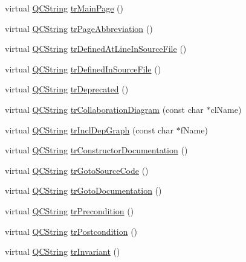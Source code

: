 \begin{DoxyCompactItemize}
virtual \hyperlink{class_q_c_string}{Q\+C\+String} \hyperlink{class_translator_serbian_cyrillic_a3575c3499807135ec439529feaaf319e}{tr\+Main\+Page} ()
\item 
virtual \hyperlink{class_q_c_string}{Q\+C\+String} \hyperlink{class_translator_serbian_cyrillic_ab4fa3b34300ff2dd5b562548f2bf50ea}{tr\+Page\+Abbreviation} ()
\item 
virtual \hyperlink{class_q_c_string}{Q\+C\+String} \hyperlink{class_translator_serbian_cyrillic_a5c558340815527239dfc883fd4731fed}{tr\+Defined\+At\+Line\+In\+Source\+File} ()
\item 
virtual \hyperlink{class_q_c_string}{Q\+C\+String} \hyperlink{class_translator_serbian_cyrillic_a756f6eff8bb5841f2723a80a013a2e83}{tr\+Defined\+In\+Source\+File} ()
\item 
virtual \hyperlink{class_q_c_string}{Q\+C\+String} \hyperlink{class_translator_serbian_cyrillic_ae89bbdf8b8e4b9a1e808e2f22152cce9}{tr\+Deprecated} ()
\item 
virtual \hyperlink{class_q_c_string}{Q\+C\+String} \hyperlink{class_translator_serbian_cyrillic_a3f0aae98d1b0afd66be7bac0c4175524}{tr\+Collaboration\+Diagram} (const char $\ast$cl\+Name)
\item 
virtual \hyperlink{class_q_c_string}{Q\+C\+String} \hyperlink{class_translator_serbian_cyrillic_a984142e341cc41affb993ee7aab7ffaf}{tr\+Incl\+Dep\+Graph} (const char $\ast$f\+Name)
\item 
virtual \hyperlink{class_q_c_string}{Q\+C\+String} \hyperlink{class_translator_serbian_cyrillic_a54212d40f6ae0d1a703b8c883495fe82}{tr\+Constructor\+Documentation} ()
\item 
virtual \hyperlink{class_q_c_string}{Q\+C\+String} \hyperlink{class_translator_serbian_cyrillic_af8c14c4f370b77b299099f342790f3eb}{tr\+Goto\+Source\+Code} ()
\item 
virtual \hyperlink{class_q_c_string}{Q\+C\+String} \hyperlink{class_translator_serbian_cyrillic_aed7a94e0650e6fdfa375a942c42eb767}{tr\+Goto\+Documentation} ()
\item 
virtual \hyperlink{class_q_c_string}{Q\+C\+String} \hyperlink{class_translator_serbian_cyrillic_a385415b26addbfb64fd9105111b88c6b}{tr\+Precondition} ()
\item 
virtual \hyperlink{class_q_c_string}{Q\+C\+String} \hyperlink{class_translator_serbian_cyrillic_aa7394384163a79b41ce563bcb6808d3d}{tr\+Postcondition} ()
\item 
virtual \hyperlink{class_q_c_string}{Q\+C\+String} \hyperlink{class_translator_serbian_cyrillic_a32467041236c726688770702ecba34fc}{tr\+Invariant} ()

\end{DoxyCompactItemize}
